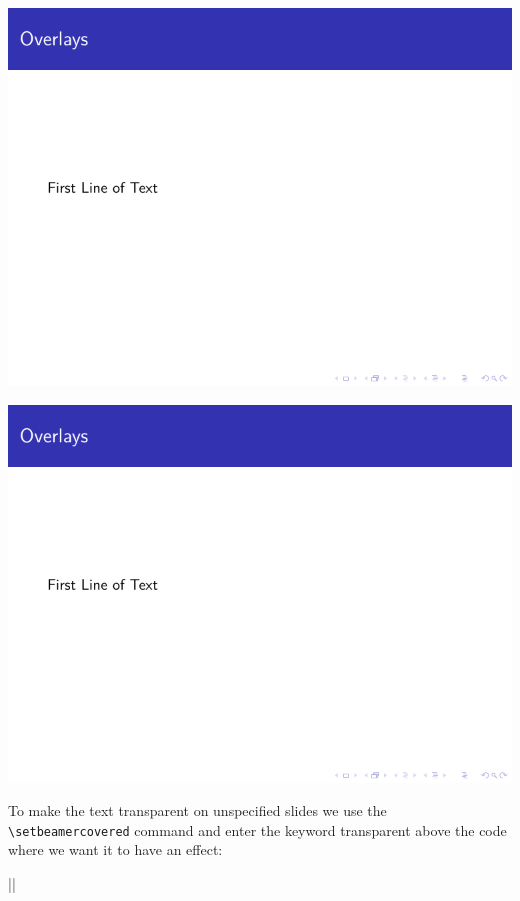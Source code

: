 \begin{column}{0.5\textwidth}
\includegraphics[page=2]{examples/beamer/overlay-onslide.pdf}

\includegraphics[page=3]{examples/beamer/overlay-onslide.pdf}

To make the text transparent on unspecified slides we use the \verb|\setbeamercovered| command and enter the keyword transparent above the code where we want it to have an effect:

||


\end{column}
